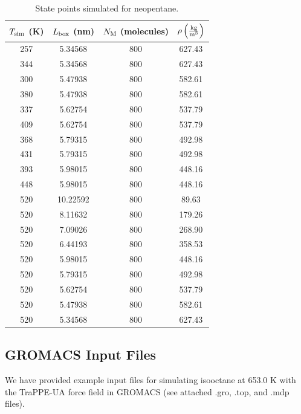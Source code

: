 \documentclass[journal=jctc,manuscript=article]{achemso}
\begin{document}
\begin{table}[p!]
	\caption{State points simulated for neopentane.} \label{tab:NEOC5H12 state points}
	\begin{center}
		\begin{tabular}{|c|c|c|c|}
			\hline
			$T_{\rm sim}$ (K) & $L_{\rm box}$ (nm) & $N_{\rm M}$ (molecules) & $\rho \left(\frac{\rm kg}{\rm m^3}\right)$ \\ \hline
			257 & 5.34568  & 800 & 627.43 \\
			344 & 5.34568  & 800 & 627.43 \\
			300 & 5.47938  & 800 & 582.61 \\
			380 & 5.47938  & 800 & 582.61 \\
			337 & 5.62754  & 800 & 537.79 \\
			409 & 5.62754  & 800 & 537.79 \\
			368 & 5.79315  & 800 & 492.98 \\
			431 & 5.79315  & 800 & 492.98 \\
			393 & 5.98015  & 800 & 448.16 \\
			448 & 5.98015  & 800 & 448.16 \\
			520 & 10.22592 & 800 & 89.63  \\
			520 & 8.11632  & 800 & 179.26 \\
			520 & 7.09026  & 800 & 268.90 \\
			520 & 6.44193  & 800 & 358.53 \\
			520 & 5.98015  & 800 & 448.16 \\
			520 & 5.79315  & 800 & 492.98 \\
			520 & 5.62754  & 800 & 537.79 \\
			520 & 5.47938  & 800 & 582.61 \\
			520 & 5.34568  & 800 & 627.43 \\
			\hline
		\end{tabular}
	\end{center}
\end{table}

\subsection{GROMACS Input Files} \label{GROMACS Input Files}

We have provided example input files for simulating isooctane at 653.0 K with the TraPPE-UA force field in GROMACS (see attached .gro, .top, and .mdp files).

\newpage
\end{document}
